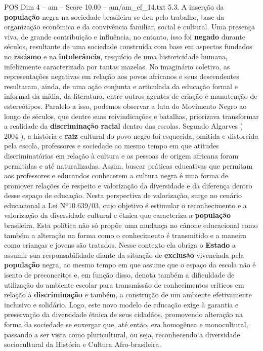 \begin{textsample}{POS Dim 4 – am – Score 10.00 – am/am\_ef\_14.txt}  \label{ex:f4_pos_105}
5.3.
A inserção da \textbf{população} negra na sociedade brasileira se deu pelo trabalho, base da organização econômica e da convivência familiar, social e cultural.
Uma presença viva, de grande contribuição e influência, no entanto, isso foi \textbf{negado} durante séculos, resultante de uma sociedade construída com base em aspectos fundados no \textbf{racismo} e na \textbf{intolerância}, resquício de uma historicidade humana, infelizmente caracterizada por tantas mazelas.
No imaginário coletivo, as representações negativas em relação aos povos africanos e seus descendentes resultaram, ainda, de uma ação conjunta e articulada da educação formal e informal da mídia, da literatura, entre outros agentes de criação e manutenção de estereótipos.
Paralelo a isso, podemos observar a luta do Movimento Negro ao longo de séculos, que dentre suas reivindicações e batalhas, priorizava transformar a realidade da \textbf{discriminação} \textbf{racial} dentro das escolas.
Segundo Algarves ( 2004 ), a história e \textbf{raiz} cultural do povo negro foi esquecida, omitida e distorcida pela escola, professores e sociedade ao mesmo tempo em que atitudes discriminatórias em relação à cultura e as pessoas de origem africana foram permitidas e até naturalizadas.
Assim, buscar práticas educativas que permitam aos professores e educandos conhecerem a cultura negra é uma forma de promover relações de respeito e valorização da diversidade e da diferença dentro desse espaço de educação.
Nesta perspectiva de valorização, surge no cenário educacional a Lei Nº10.639/03, cujo objetivo é estimular o reconhecimento e a valorização da diversidade cultural e étnica que caracteriza a \textbf{população} brasileira.
Esta política não só propõe uma mudança no cânone educacional como também a alteração na forma como o conhecimento é transmitido e a maneira como crianças e jovens são tratados.
Nesse contexto ela obriga o \textbf{Estado} a assumir sua responsabilidade diante da situação de \textbf{exclusão} vivenciada pela \textbf{população} negra, ao mesmo tempo em que assume que o espaço da escola não é isento de preconceitos e, em função disso, denota também a dificuldade de utilização do ambiente escolar para transmissão de conhecimentos críticos em relação à \textbf{discriminação} e também, a construção de um ambiente efetivamente inclusivo e solidário.
Logo, este novo modelo de educação exige à garantia e preservação da diversidade étnica de seus cidadãos, promovendo alteração na forma da sociedade se enxergar que, até então, era homogênea e monocultural, passando a ser vista como pluricultural, ou seja, reconhecendo a diversidade sociocultural da História e Cultura Afro-brasileira.

\end{textsample}
